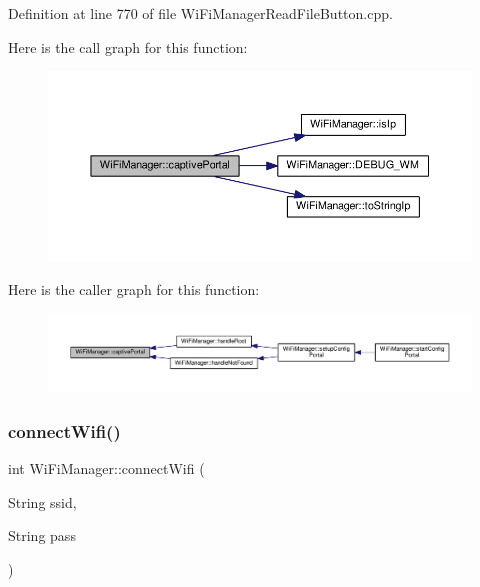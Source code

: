 Definition at line 770 of file Wi\+Fi\+Manager\+Read\+File\+Button.\+cpp.

Here is the call graph for this function\+:\nopagebreak
\begin{figure}[H]
\begin{center}
\leavevmode
\includegraphics[width=350pt]{class_wi_fi_manager_a4ef4298deb224212e5242c456669a973_cgraph}
\end{center}
\end{figure}
Here is the caller graph for this function\+:\nopagebreak
\begin{figure}[H]
\begin{center}
\leavevmode
\includegraphics[width=350pt]{class_wi_fi_manager_a4ef4298deb224212e5242c456669a973_icgraph}
\end{center}
\end{figure}
\mbox{\label{class_wi_fi_manager_ae0ae27b5543b47585728c084c3bbdca7}} 
\subsubsection{\texorpdfstring{connect\+Wifi()}{connectWifi()}}
{\footnotesize\ttfamily int Wi\+Fi\+Manager\+::connect\+Wifi (\begin{DoxyParamCaption}\item[{String}]{ssid,  }\item[{String}]{pass }\end{DoxyParamCaption})\hspace{0.3cm}{\ttfamily [private]}}



